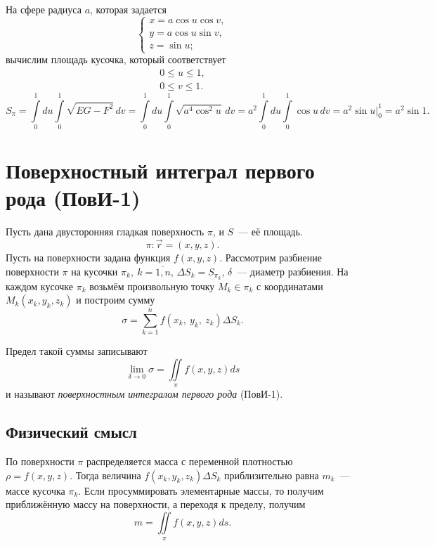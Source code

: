 \documentclass[../../main.tex]{subfiles}
\begin{document}
\begin{exmp}
На сфере радиуса $a$, которая задается
\[
\begin{cases}
 x = a\cos u\cos v, \\
 y = a\cos u\sin v,\\
 z = \sin u;
\end{cases}\]
вычислим площадь кусочка, который соответствует
\begin{gather*}
0 \leq u \leq 1, \\ 0 \leq v \leq 1.
\end{gather*}
\[
 S_\pi = \int\limits_0^1du\int\limits_0^1\sqrt{EG-F^2}\,dv = 
 \int\limits_0^1du\int\limits_0^1\sqrt{a^4\cos^2u}\,dv = 
 a^2\int\limits_0^1du\int\limits_0^1\cos u\,dv = a^2\sin u\big|_0^1 = a^2\sin 
 1.
\]
\end{exmp}

\section{Поверхностный интеграл первого рода (ПовИ-1)}

Пусть дана двусторонняя гладкая поверхность $\pi$, и $S$~--- её площадь. \[\pi 
: 
\vec{r} = (x, y, z).\]
Пусть на поверхности задана функция $f(x, y, z)$. 
Рассмотрим разбиение поверхности $\pi$ на кусочки $\pi_k,\ k = \overline{1, 
n}$, $\Delta 
S_k = S_{\pi_k}$, $\delta$~--- диаметр разбиения. На каждом кусочке $\pi_k$ 
возьмём произвольную точку $M_k \in \pi_k$ с координатами $M_k(x_k, y_k, z_k)$ и 
построим сумму \[\sigma = \sum\limits_{k = 1}^nf(x_k, \ y_k, \ z_k)\Delta 
S_k.\]

Предел такой суммы записывают
\[\lim\limits_{\delta\rightarrow0}\sigma = \iint\limits_\pi f(x, y, 
z)ds\] и называют \emph{поверхностным интегралом первого рода} (ПовИ-1).

\subsection{Физический смысл}
По поверхности $\pi$ распределяется масса с переменной плотностью $\rho = f(x, 
y, z)$. Тогда величина $f(x_k, y_k, z_k)\Delta S_k$ 
приблизительно равна $m_k$~--- массе кусочка $\pi_k$. Если просуммировать 
элементарные массы, то получим приближённую массу на поверхности, а переходя к 
пределу, получим \[m = \iint\limits_\pi f(x, y, z)ds.\]
\end{document}
